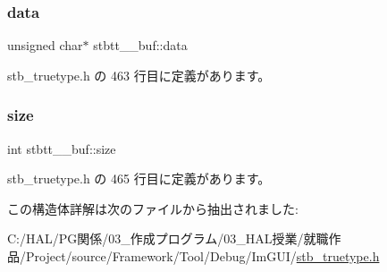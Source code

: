 \subsubsection{\texorpdfstring{data}{data}}
{\footnotesize\ttfamily unsigned char$\ast$ stbtt\+\_\+\+\_\+buf\+::data}



 stb\+\_\+truetype.\+h の 463 行目に定義があります。

\mbox{\label{structstbtt____buf_a0f6f2d06981ab4a5697233bbd0cafb5b}} 
\subsubsection{\texorpdfstring{size}{size}}
{\footnotesize\ttfamily int stbtt\+\_\+\+\_\+buf\+::size}



 stb\+\_\+truetype.\+h の 465 行目に定義があります。



この構造体詳解は次のファイルから抽出されました\+:\begin{DoxyCompactItemize}
\item 
C\+:/\+H\+A\+L/\+P\+G関係/03\+\_\+作成プログラム/03\+\_\+\+H\+A\+L授業/就職作品/\+Project/source/\+Framework/\+Tool/\+Debug/\+Im\+G\+U\+I/\mbox{\hyperlink{stb__truetype_8h}{stb\+\_\+truetype.\+h}}\end{DoxyCompactItemize}
